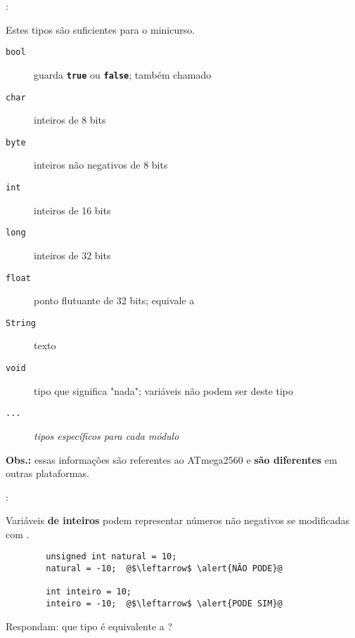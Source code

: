 \begin{frame}{\insertsection: \insertsubsection}

	Estes tipos são suficientes para o minicurso.

	\begin{description}
		\item[\texttt{bool}] guarda \textbf{\texttt{true}} ou \textbf{\texttt{false}}; também chamado \texttt{}
		\item[\texttt{char}] inteiros de 8 bits
		\item[\texttt{byte}] inteiros não negativos de 8 bits
		\item[\texttt{int}] inteiros de 16 bits
		\item[\texttt{long}] inteiros de 32 bits
		\item[\texttt{float}] ponto flutuante de 32 bits; equivale a \texttt{}
		\item[\texttt{String}] texto
		\item[\texttt{void}] tipo que significa "nada"; variáveis não podem ser deste tipo
		\item[\texttt{...}] \emph{tipos específicos para cada módulo}
	\end{description}

	\vfill
	\textbf{Obs.:} essas informações são referentes ao ATmega2560 e \textbf{são diferentes} em outras plataformas.

\end{frame}


\begin{frame}[fragile]{\insertsection: \insertsubsection}

	Variáveis \textbf{de inteiros} podem representar números não negativos se modificadas com \texttt{}.
	\begin{verbatim}
		unsigned int natural = 10;
		natural = -10;  @$\leftarrow$ \alert{NÃO PODE}@

		int inteiro = 10;
		inteiro = -10;  @$\leftarrow$ \alert{PODE SIM}@
	\end{verbatim}

	\pause
	\bigskip
	Respondam: que tipo é equivalente a \texttt{}?\\
	\only<0|handout:2>{R: \texttt{\HighlightSpecial{byte}}}

\end{frame}


